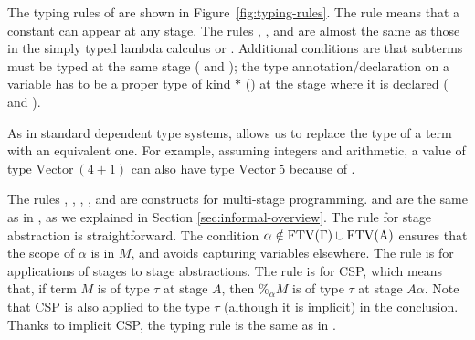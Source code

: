 The typing rules of \LMD are shown in Figure~\ref{fig:typing-rules}.
The rule \TConst{} means that a constant can appear at any stage.
The rules \TVar, \TAbs, and \TApp{} are almost the same as those in the simply typed
lambda calculus or \LLF.  Additional conditions are that subterms must be
typed at the same stage (\TAbs{} and \TApp); the type
annotation/declaration on a variable has to be a proper type of kind
$*$ (\TAbs) at the stage where it is declared (\TVar{} and \TAbs).



As in standard dependent type systems, \TConv{} allows us to replace the type
of a term with an equivalent one. For example, assuming integers and
arithmetic, a value of type $\textrm{Vector}\ (4+1)$ can also have type
$\textrm{Vector}\ 5$ because of \TConv{}.

The rules \TTB, \TTBL, \TGen, \TIns, and \TCsp{} are constructs for
multi-stage programming. \TTB{} and \TTBL{} are the same as in \LTP, as we
explained in Section \ref{sec:informal-overview}. The rule \TGen{} for stage
abstraction is straightforward. The condition
$\alpha\notin\rm{FTV}(\Gamma)\cup\rm{FTV}(A)$ ensures that the scope of $\alpha$
is in $M$, and avoids capturing variables elsewhere. The
rule \TIns{} is for applications of stages to stage abstractions. The rule
\TCsp{} is for CSP, which means that, if term $M$ is of type $\tau$ at stage
$A$, then $\%_\alpha M$ is of type $\tau$ at stage $A\alpha$. Note that CSP
is also applied to the type \(\tau\) (although it is implicit) in the
conclusion. Thanks to implicit CSP, the typing rule is the same as in \LTP.


